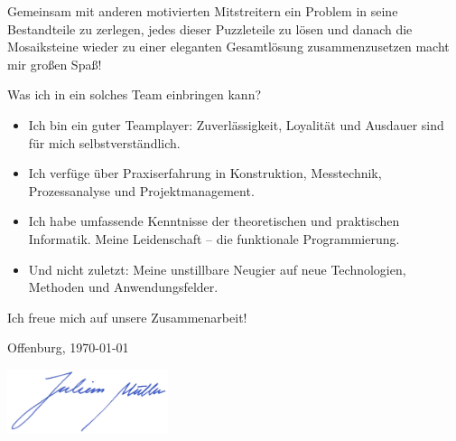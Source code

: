\documentclass[noindent]{scrartcl}
\begin{document}
\thispagestyle{empty}

\begin{minipage}{\textwidth}
\vspace{4cm}
\end{minipage}

\noindent\spacedlowsmallcaps{\huge \textcolor{blaze}{Ich liebe es Probleme zu lösen!}}
\large
\vspace{0.5em}

\noindent Gemeinsam mit anderen motivierten Mitstreitern
ein Problem in seine Bestandteile zu zerlegen, jedes dieser Puzzleteile
zu lösen und danach die Mosaiksteine wieder zu einer eleganten Gesamtlösung 
zusammenzusetzen macht mir gro\ss en Spa\ss !\vspace{0.5em}


\noindent {}Was ich in ein solches Team einbringen kann?
\begin{itemize}
\item {}
    Ich bin ein guter Teamplayer: Zuverlässigkeit, Loyalität und 
    Ausdauer sind für mich selbstverständlich.
\item {} 
    Ich verfüge über Praxiserfahrung in Konstruktion, Messtechnik, Prozessanalyse und Projektmanagement.
\item {}
    Ich habe umfassende Kenntnisse der theoretischen und praktischen Informatik. 
    Meine Leidenschaft -- die funktionale Programmierung.
\item {} 
    Und nicht zuletzt: Meine unstillbare Neugier auf neue Technologien, Methoden
    und Anwendungsfelder.
\end{itemize}
\noindent Ich freue mich auf unsere Zusammenarbeit!\newline

\noindent Offenburg, \today

\begin{minipage}{\textwidth}
\vspace{0.5em}
\hspace{-1em}\includegraphics[width=4.7cm]{sig}
\end{minipage}
\end{document}
